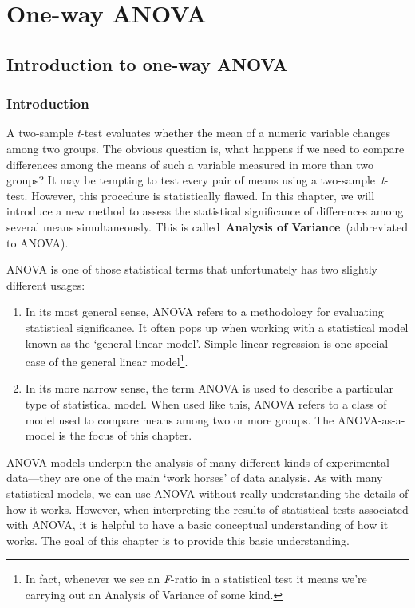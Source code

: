 \documentclass[
]{book}
\providecommand{\tightlist}{%
  \setlength{\itemsep}{0pt}\setlength{\parskip}{0pt}}
\begin{document}
\hypertarget{part-one-way-anova}{%
\part{One-way ANOVA}\label{part-one-way-anova}}

\hypertarget{introduction-to-one-way-anova}{%
\chapter{Introduction to one-way ANOVA}\label{introduction-to-one-way-anova}}

\hypertarget{intro}{%
\section{Introduction}\label{intro}}

A two-sample \emph{t}-test evaluates whether the mean of a numeric variable changes among two groups. The obvious question is, what happens if we need to compare differences among the means of such a variable measured in more than two groups? It may be tempting to test every pair of means using a two-sample~\emph{t}-test. However, this procedure is statistically flawed. In this chapter, we will introduce a new method to assess the statistical significance of differences among several means simultaneously. This is called~\textbf{Analysis of Variance}~(abbreviated to ANOVA).

ANOVA is one of those statistical terms that unfortunately has two slightly different usages:

\begin{enumerate}
\def\labelenumi{\arabic{enumi}.}
\tightlist
\item
  In its most general sense, ANOVA refers to a methodology for evaluating statistical significance. It often pops up when working with a statistical model known as the `general linear model'. Simple linear regression is one special case of the general linear model\footnote{In fact, whenever we see an \emph{F}-ratio in a statistical test it means we're carrying out an Analysis of Variance of some kind.}.
\item
  In its more narrow sense, the term ANOVA is used to describe a particular type of statistical model. When used like this, ANOVA refers to a class of model used to compare means among two or more groups. The ANOVA-as-a-model is the focus of this chapter.
\end{enumerate}

ANOVA models underpin the analysis of many different kinds of experimental data---they are one of the main `work horses' of data analysis. As with many statistical models, we can use ANOVA without really understanding the details of how it works. However, when interpreting the results of statistical tests associated with ANOVA, it is helpful to have a basic conceptual understanding of how it works. The goal of this chapter is to provide this basic understanding.
\end{document}
